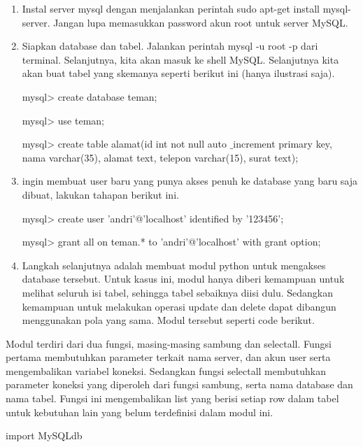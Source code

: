 \begin{enumerate}
\item Instal server mysql dengan menjalankan perintah sudo apt-get install mysql-server. Jangan lupa memasukkan password akun root untuk server MySQL. \par
\noindent 
\item Siapkan database dan tabel. Jalankan perintah mysql -u root -p dari terminal. Selanjutnya, kita akan masuk ke shell MySQL. Selanjutnya kita akan buat tabel yang skemanya seperti berikut ini (hanya ilustrasi saja). \par
mysql> create database teman; \par
mysql> use teman; \hspace*{1.69in}  \par
mysql> create table alamat(id int not null auto $  \_  $increment primary key, nama varchar(35), alamat text, telepon varchar(15), surat text); \par
\vspace{12pt}
\noindent 
\item  ingin membuat user baru yang punya akses penuh ke database yang baru saja dibuat, lakukan tahapan berikut ini. \par
mysql> create user 'andri'@'localhost' identified by '123456'; \par
mysql> grant all on teman.* to 'andri'@'localhost' with grant option; \par
\noindent 
\item Langkah selanjutnya adalah membuat modul python untuk mengakses database tersebut. Untuk kasus ini, modul hanya diberi kemampuan untuk melihat seluruh isi tabel, sehingga tabel sebaiknya diisi dulu. Sedangkan kemampuan untuk melakukan operasi update dan delete dapat dibangun menggunakan pola yang sama. Modul tersebut seperti code berikut.\end{enumerate}
 \par
\vspace{12pt}
Modul terdiri dari dua fungsi, masing-masing sambung dan selectall. Fungsi pertama membutuhkan parameter terkait nama server, dan akun user serta mengembalikan variabel koneksi. Sedangkan fungsi selectall membutuhkan parameter koneksi yang diperoleh dari fungsi sambung, serta nama database dan nama tabel. Fungsi ini mengembalikan list yang berisi setiap row dalam tabel untuk kebutuhan lain yang belum terdefinisi dalam modul ini. \par
\vspace{12pt}
\noindent 
import MySQLdb \par

